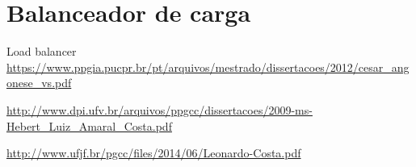 \chapter{Balanceador de carga}

Load balancer \url{https://www.ppgia.pucpr.br/pt/arquivos/mestrado/dissertacoes/2012/cesar_angonese_vs.pdf}

\url{http://www.dpi.ufv.br/arquivos/ppgcc/dissertacoes/2009-ms-Hebert_Luiz_Amaral_Costa.pdf}

\url{http://www.ufjf.br/pgcc/files/2014/06/Leonardo-Costa.pdf}
